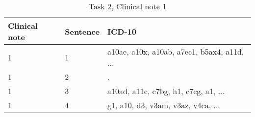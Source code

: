 \begin{table}[!htb] \footnotesize \center
\caption{Task 2, Clinical note 1 \label{tab:t2c1}}
\begin{tabularx}{\textwidth}{l l X}
    \toprule
    Clinical note & Sentence & ICD-10 \\
    \midrule
	 1 & 1 & a10ae, a10x, a10ab, a7ec1, b5ax4, a11d, ... \\
	 1 & 2 & . \\
	 1 & 3 & a10ad, a11c, c7bg, h1, c7cg, a1, ... \\
	 1 & 4 & g1, a10, d3, v3am, v3az, v4ca, ... \\
	\bottomrule
\end{tabularx}
\end{table}
